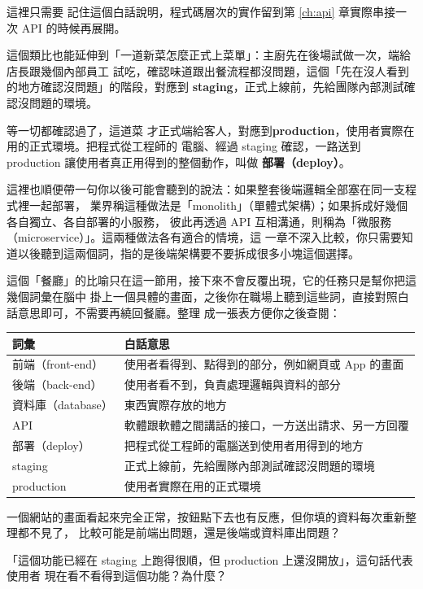 這裡只需要
記住這個白話說明，程式碼層次的實作留到第 \ref{ch:api} 章實際串接一次 API 的時候再展開。

這個類比也能延伸到「一道新菜怎麼正式上菜單」：主廚先在後場試做一次，端給店長跟幾個內部員工
試吃，確認味道跟出餐流程都沒問題，這個「先在沒人看到的地方確認沒問題」的階段，對應到
\textbf{staging}，正式上線前，先給團隊內部測試確認沒問題的環境。

等一切都確認過了，這道菜
才正式端給客人，對應到\textbf{production}，使用者實際在用的正式環境。把程式從工程師的
電腦、經過 staging 確認，一路送到 production 讓使用者真正用得到的整個動作，叫做
\textbf{部署（deploy）}。

這裡也順便帶一句你以後可能會聽到的說法：如果整套後端邏輯全部塞在同一支程式裡一起部署，
業界稱這種做法是「monolith」（單體式架構）；如果拆成好幾個各自獨立、各自部署的小服務，
彼此再透過 API 互相溝通，則稱為「微服務（microservice）」。這兩種做法各有適合的情境，這
一章不深入比較，你只需要知道以後聽到這兩個詞，指的是後端架構要不要拆成很多小塊這個選擇。

這個「餐廳」的比喻只在這一節用，接下來不會反覆出現，它的任務只是幫你把這幾個詞彙在腦中
掛上一個具體的畫面，之後你在職場上聽到這些詞，直接對照白話意思即可，不需要再繞回餐廳。整理
成一張表方便你之後查閱：

\begin{center}
\begin{tabular}{@{}ll@{}}
\toprule
詞彙 & 白話意思 \\
\midrule
前端（front-end） & 使用者看得到、點得到的部分，例如網頁或 App 的畫面 \\
後端（back-end） & 使用者看不到，負責處理邏輯與資料的部分 \\
資料庫（database） & 東西實際存放的地方 \\
API & 軟體跟軟體之間講話的接口，一方送出請求、另一方回覆 \\
部署（deploy） & 把程式從工程師的電腦送到使用者用得到的地方 \\
staging & 正式上線前，先給團隊內部測試確認沒問題的環境 \\
production & 使用者實際在用的正式環境 \\
\bottomrule
\end{tabular}
\end{center}

\begin{drills}[label=drills:software-anatomy]
\item 一個網站的畫面看起來完全正常，按鈕點下去也有反應，但你填的資料每次重新整理都不見了，
比較可能是前端出問題，還是後端或資料庫出問題？
\item 「這個功能已經在 staging 上跑得很順，但 production 上還沒開放」，這句話代表使用者
現在看不看得到這個功能？為什麼？
\end{drills}

